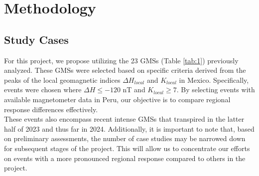 \documentclass[12pt]{article}
\begin{document}
\section{Methodology}

\subsection{Study Cases}
\label{SS:2-1}

For this project, we propose utilizing the 23 GMSs (Table \ref{tab:1}) previously analyzed. These GMSs were selected based on specific criteria derived from the peaks of the local geomagnetic indices $\Delta H_{local}$ and $K_{local}$ in Mexico. Specifically, events were chosen where $\Delta H \leq -120$ nT and $K_{local} \geq 7$. By selecting events with available magnetometer data in Peru, our objective is to compare regional response differences effectively.\\ 

These events also encompass recent intense GMSs that transpired in the latter half of 2023 and thus far in 2024. Additionally, it is important to note that, based on preliminary assessments, the number of case studies may be narrowed down for subsequent stages of the project. This will allow us to concentrate our efforts on events with a more pronounced regional response compared to others in the project.\\
\end{document}
